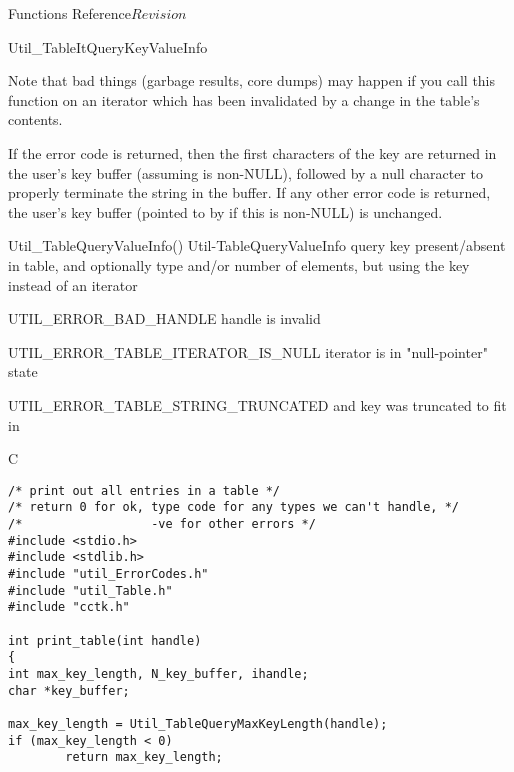 \begin{cactuspart}{ Functions Reference}{}{$Revision$}
\begin{FunctionDescription}{Util\_TableItQueryKeyValueInfo}
\begin{Discussion}
Note that bad things (garbage results, core dumps) may happen if
you call this function on an iterator which has been invalidated
by a change in the table's contents.

If the error code  is returned,
then the first  characters of the key are
returned in the user's key buffer (assuming  is non-NULL),
followed by a null character to properly terminate the string in the
buffer.  If any other error code is returned, the user's key buffer
(pointed to by  if this is non-NULL) is unchanged.
\end{Discussion}

\begin{SeeAlsoSection}
\begin{SeeAlso2} {Util\_TableQueryValueInfo()} {Util-TableQueryValueInfo}
query key present/absent in table, and optionally type and/or number
of elements, but using the key instead of an iterator
\end{SeeAlso2}
\end{SeeAlsoSection}

\begin{ErrorSection}
\begin{Error}{UTIL\_ERROR\_BAD\_HANDLE}
handle is invalid
\end{Error}
\begin{Error}{UTIL\_ERROR\_TABLE\_ITERATOR\_IS\_NULL}
\quad
iterator is in "null-pointer" state
\end{Error}
\begin{Error}{UTIL\_ERROR\_TABLE\_STRING\_TRUNCATED}
\quad
{} and key was truncated to fit in 
\end{Error}
\end{ErrorSection}

\begin{ExampleSection}
\begin{Example}{C}
\begin{verbatim}
/* print out all entries in a table */
/* return 0 for ok, type code for any types we can't handle, */
/*                  -ve for other errors */
#include <stdio.h>
#include <stdlib.h>
#include "util_ErrorCodes.h"
#include "util_Table.h"
#include "cctk.h"

int print_table(int handle)
{
int max_key_length, N_key_buffer, ihandle;
char *key_buffer;

max_key_length = Util_TableQueryMaxKeyLength(handle);
if (max_key_length < 0)
        return max_key_length;


\end{verbatim}
\end{Example}
\end{ExampleSection}
\end{FunctionDescription}
\end{cactuspart}
